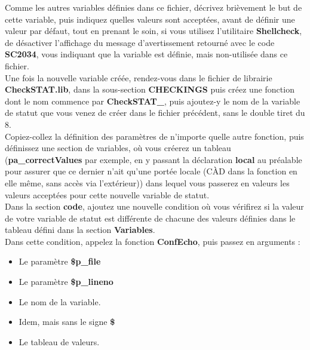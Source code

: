 \documentclass[a4paper,10pt]{article}
\begin{document}
Comme les autres variables définies dans ce fichier, décrivez brièvement le but de cette variable, puis indiquez quelles valeurs sont acceptées, avant de définir une valeur par défaut, tout en prenant le soin, si vous utilisez l'utilitaire \textbf{\color{gray}Shellcheck}, de désactiver l'affichage du message d'avertissement retourné avec le code \textbf{SC2034}, vous indiquant que la variable est définie, mais non-utilisée dans ce fichier.\\[1\baselineskip]

Une fois la nouvelle variable créée, rendez-vous dans le fichier de librairie \textbf{\color{lime}CheckSTAT.lib}, dans la sous-section \textbf{CHECKINGS} puis créez une fonction dont le nom commence par \textbf{\color{mauve}CheckSTAT\_}, puis ajoutez-y le nom de la variable de statut que vous venez de créer dans le fichier précédent, sans le double tiret du 8.\\[1\baselineskip]

Copiez-collez la définition des paramètres de n'importe quelle autre fonction, puis définissez une section de variables, où vous créerez un tableau (\textbf{pa\_correctValues} par exemple, en y passant la déclaration \textbf{\color{gray}local} au préalable pour assurer que ce dernier n'ait qu'une portée locale (CÀD dans la fonction en elle même, sans accès via l'extérieur)) dans lequel vous passerez en valeurs les valeurs acceptées pour cette nouvelle variable de statut.\\[1\baselineskip]

Dans la section \textbf{code}, ajoutez une nouvelle condition où vous vérifirez si la valeur de votre variable de statut est différente de chacune des valeurs définies dans le tableau défini dans la section \textbf{Variables}.\\[1\baselineskip]

Dans cette condition, appelez la fonction \textbf{\color{mauve}ConfEcho}, puis passez en arguments :
\begin{itemize}
    \item Le paramètre \textbf{\color{orange}\$p\_file}\\[1\baselineskip]

    \item Le paramètre \textbf{\color{orange}\$p\_lineno}\\[1\baselineskip]

    \item Le nom de la variable.\\[1\baselineskip]

    \item Idem, mais sans le signe \textbf{\$}\\[1\baselineskip]

    \item Le tableau de valeurs.\\[1\baselineskip]
\end{itemize}
\end{document}
